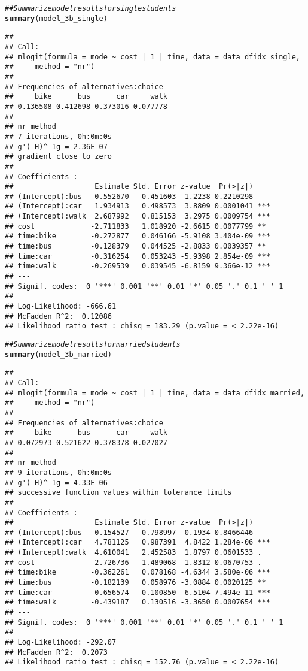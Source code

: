 \documentclass[11pt,letterpaper]{article}\usepackage[]{graphicx}\usepackage[]{color}
\makeatletter
\newcommand{\hlcom}[1]{\textcolor[rgb]{0.678,0.584,0.686}{\textit{#1}}}%
\newcommand{\hlstd}[1]{\textcolor[rgb]{0.345,0.345,0.345}{#1}}%
\newcommand{\hlkwd}[1]{\textcolor[rgb]{0.737,0.353,0.396}{\textbf{#1}}}%
\newenvironment{kframe}{%
 \def\at@end@of@kframe{}%
 \ifinner\ifhmode%
  \def\at@end@of@kframe{\end{minipage}}%
  \begin{minipage}{\columnwidth}%
 \fi\fi%
 \def\FrameCommand##1{\hskip\@totalleftmargin \hskip-\fboxsep
 \colorbox{shadecolor}{##1}\hskip-\fboxsep
     \hskip-\linewidth \hskip-\@totalleftmargin \hskip\columnwidth}%
 \MakeFramed {\advance\hsize-\width
   \@totalleftmargin\z@ \linewidth\hsize
   \@setminipage}}%
 {\par\unskip\endMakeFramed%
 \at@end@of@kframe}
\newenvironment{knitrout}{}{} %
\makeatother
\begin{document}
\begin{enumerate}[label=\alph*., leftmargin=*]
\begin{enumerate}[label=\roman*.]
\begin{knitrout}
\color{fgcolor}\begin{kframe}
\begin{alltt}
\hlcom{## Summarize model results for single students}
\hlkwd{summary}\hlstd{(model_3b_single)}
\end{alltt}
\begin{verbatim}
## 
## Call:
## mlogit(formula = mode ~ cost | 1 | time, data = data_dfidx_single, 
##     method = "nr")
## 
## Frequencies of alternatives:choice
##     bike      bus      car     walk 
## 0.136508 0.412698 0.373016 0.077778 
## 
## nr method
## 7 iterations, 0h:0m:0s 
## g'(-H)^-1g = 2.36E-07 
## gradient close to zero 
## 
## Coefficients :
##                   Estimate Std. Error z-value  Pr(>|z|)    
## (Intercept):bus  -0.552670   0.451603 -1.2238 0.2210298    
## (Intercept):car   1.934913   0.498573  3.8809 0.0001041 ***
## (Intercept):walk  2.687992   0.815153  3.2975 0.0009754 ***
## cost             -2.711833   1.018920 -2.6615 0.0077799 ** 
## time:bike        -0.272877   0.046166 -5.9108 3.404e-09 ***
## time:bus         -0.128379   0.044525 -2.8833 0.0039357 ** 
## time:car         -0.316254   0.053243 -5.9398 2.854e-09 ***
## time:walk        -0.269539   0.039545 -6.8159 9.366e-12 ***
## ---
## Signif. codes:  0 '***' 0.001 '**' 0.01 '*' 0.05 '.' 0.1 ' ' 1
## 
## Log-Likelihood: -666.61
## McFadden R^2:  0.12086 
## Likelihood ratio test : chisq = 183.29 (p.value = < 2.22e-16)
\end{verbatim}
\begin{alltt}
\hlcom{## Summarize model results for married students}
\hlkwd{summary}\hlstd{(model_3b_married)}
\end{alltt}
\begin{verbatim}
## 
## Call:
## mlogit(formula = mode ~ cost | 1 | time, data = data_dfidx_married, 
##     method = "nr")
## 
## Frequencies of alternatives:choice
##     bike      bus      car     walk 
## 0.072973 0.521622 0.378378 0.027027 
## 
## nr method
## 9 iterations, 0h:0m:0s 
## g'(-H)^-1g = 4.33E-06 
## successive function values within tolerance limits 
## 
## Coefficients :
##                   Estimate Std. Error z-value  Pr(>|z|)    
## (Intercept):bus   0.154527   0.798997  0.1934 0.8466446    
## (Intercept):car   4.781125   0.987391  4.8422 1.284e-06 ***
## (Intercept):walk  4.610041   2.452583  1.8797 0.0601533 .  
## cost             -2.726736   1.489068 -1.8312 0.0670753 .  
## time:bike        -0.362261   0.078168 -4.6344 3.580e-06 ***
## time:bus         -0.182139   0.058976 -3.0884 0.0020125 ** 
## time:car         -0.656574   0.100850 -6.5104 7.494e-11 ***
## time:walk        -0.439187   0.130516 -3.3650 0.0007654 ***
## ---
## Signif. codes:  0 '***' 0.001 '**' 0.01 '*' 0.05 '.' 0.1 ' ' 1
## 
## Log-Likelihood: -292.07
## McFadden R^2:  0.2073 
## Likelihood ratio test : chisq = 152.76 (p.value = < 2.22e-16)
\end{verbatim}
\end{kframe}
\end{knitrout}


\end{enumerate}
\end{enumerate}
\end{document}

